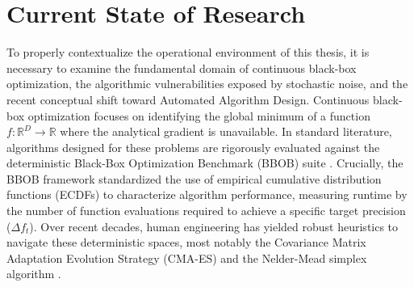 

\chapter{Current State of Research}\label{chap:research}

To properly contextualize the operational environment of this thesis, it is necessary to examine the fundamental domain of continuous black-box optimization, the algorithmic vulnerabilities exposed by stochastic noise, and the recent conceptual shift toward Automated Algorithm Design. Continuous black-box optimization focuses on identifying the global minimum of a function $f: \mathbb{R}^D \rightarrow \mathbb{R}$ where the analytical gradient is unavailable. In standard literature, algorithms designed for these problems are rigorously evaluated against the deterministic Black-Box Optimization Benchmark (BBOB) suite \cite{Hansen2010}. Crucially, the BBOB framework standardized the use of empirical cumulative distribution functions (ECDFs) to characterize algorithm performance, measuring runtime by the number of function evaluations required to achieve a specific target precision ($\Delta f_t$). Over recent decades, human engineering has yielded robust heuristics to navigate these deterministic spaces, most notably the Covariance Matrix Adaptation Evolution Strategy (CMA-ES) \cite{Hansen2001} and the Nelder-Mead simplex algorithm \cite{Nelder1965}.


